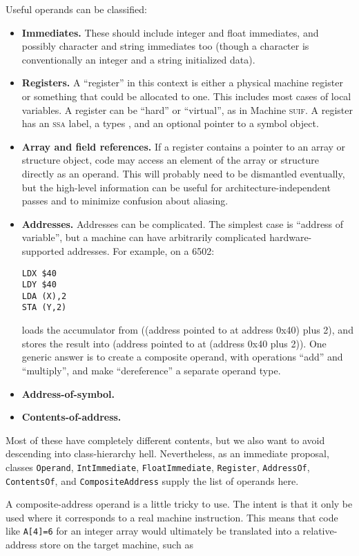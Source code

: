 \documentclass[11pt]{article}
\def\class#1{\texttt{#1}}
\def\ssa{\textsc{ssa}}
\def\suif{\textsc{suif}}
\def\machsuif{Machine \suif}
\begin{document}
Useful operands can be classified:

\begin{itemize}
\item \textbf{Immediates.}  These should include integer and float
  immediates, and possibly character and string immediates too (though
  a character is conventionally an integer and a string initialized
  data).
\item \textbf{Registers.}  A ``register'' in this context is either a
  physical machine register or something that could be allocated to
  one.  This includes most cases of local variables.  A register can
  be ``hard'' or ``virtual'', as in \machsuif.  A register has an
  \ssa{} label, a types , and an optional pointer to a symbol object.
\item \textbf{Array and field references.}  If a register contains a
  pointer to an array or structure object, code may access an element
  of the array or structure directly as an operand.  This will
  probably need to be dismantled eventually, but the high-level
  information can be useful for architecture-independent passes and to
  minimize confusion about aliasing.
\item \textbf{Addresses.}  Addresses can be complicated.  The simplest
  case is ``address of variable'', but a machine can have arbitrarily
  complicated hardware-supported addresses.  For example, on a 6502:
\begin{verbatim}
LDX $40
LDY $40
LDA (X),2
STA (Y,2)
\end{verbatim}
  loads the accumulator from ((address pointed to at address 0x40) plus
  2), and stores the result into (address pointed to at (address 0x40
  plus 2)).  One generic answer is to create a composite operand, with
  operations ``add'' and ``multiply'', and make ``dereference'' a
  separate operand type.
\item \textbf{Address-of-symbol.}
\item \textbf{Contents-of-address.}
\end{itemize}

Most of these have completely different contents, but we also want to
avoid descending into class-hierarchy hell.  Nevertheless, as an
immediate proposal, classes \class{Operand}, \class{Int\-Immediate},
\class{Float\-Immediate}, \class{Register}, \class{Address\-Of},
\class{Contents\-Of}, and \class{Composite\-Address} supply the list
of operands here.

A composite-address operand is a little tricky to use.  The intent is
that it only be used where it corresponds to a real machine
instruction.  This means that code like \verb|A[4]=6| for an integer
array would ultimately be translated into a relative-address store on
the target machine, such as
\end{document}
